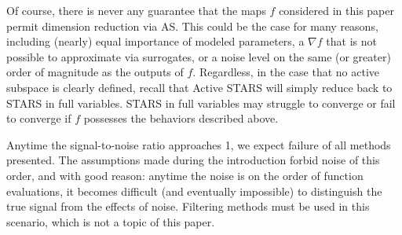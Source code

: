 \documentclass{amsart}
\begin{document}
Of course, there is never any guarantee that the maps $f$ considered in this paper permit dimension reduction via AS. This could be the case for many reasons, including (nearly) equal importance of modeled parameters, a $\nabla f$ that is not possible to approximate via surrogates, or a noise level on the same (or greater) order of magnitude as the outputs of $f$. Regardless, in the case that no active subspace is clearly defined, recall that Active STARS will simply reduce back to STARS in full variables. STARS in full variables may struggle to converge or fail to converge if $f$ possesses the behaviors described above.

Anytime the signal-to-noise ratio approaches 1, we expect failure of all methods presented. The assumptions made during the introduction forbid noise of this order, and with good reason: anytime the noise is on the order of function evaluations, it becomes difficult (and eventually impossible) to distinguish the true signal from the effects of noise. Filtering methods must be used in this scenario, which is not a topic of this paper.
\end{document}
